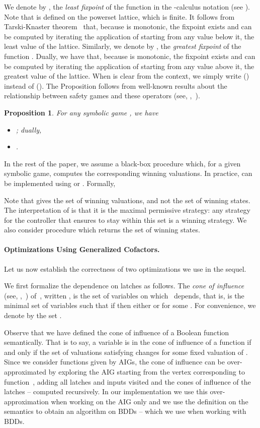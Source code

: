 \documentclass[submission,copyright,creativecommons]{eptcs}
\newtheorem{proposition}{Proposition}
\begin{document}
We denote by , the \emph{least
fixpoint} of the function  in the -calculus
notation (see \cite{ej91}). Note that  is defined on the powerset lattice,
which is finite. It follows from Tarski-Knaster theorem~\cite{tarski55} that,
because  is monotonic, the fixpoint exists and can be computed by iterating
the application of  starting from any value below it, \eg the least value of
the lattice. Similarly, we denote by , the \emph{greatest fixpoint} of the function . Dually, we have that, because  is monotonic, the fixpoint
exists and can be computed by iterating the application of  starting from any
value above it, \eg the greatest value of the lattice.
When  is clear from the context, we simply write  ()
instead of  (). The Proposition follows from well-known
results about the relationship between safety games and these operators (see,
\eg,~\cite{ag11}).
\begin{proposition}
	For any symbolic game , we have
	\begin{itemize}
		\item ; dually,
		\item .
	\end{itemize}
\end{proposition}

In the rest of the paper, we assume a black-box procedure  which, for a
given symbolic game, computes the corresponding winning valuations.  In
practice,  can be implemented using  or . Formally, 

Note that  gives the set of winning valuations, and not the set of
winning states. The interpretation of  is that it is the maximal
permissive strategy: any strategy for the controller that ensures to stay within
this set is a winning strategy.  We also consider procedure  which returns the set of winning states.

\paragraph{Optimizations Using Generalized Cofactors.}
Let us now establish the correctness of two optimizations we use in the sequel.

We first formalize the dependence on latches as follows.  The \emph{cone of
influence} (see, \eg,~\cite{cgp01}) of~, written , is
the set of variables on which~ depends, that is,  is the minimal set of variables such that if  then either  or  for some . For convenience, we denote by  the set .

Observe that we have defined the cone of influence of a Boolean function
semantically. That is to say, a variable  is in the cone of
influence of a function  if and only if the set of valuations satisfying
 changes for some fixed valuation of . Since we consider functions
given by AIGs, the cone of influence can be over-approximated by
exploring the AIG starting from the vertex corresponding to function~,
adding all latches and inputs visited and the cones of influence of the latches
-- computed recursively. In our implementation we use this over-approximation
when working on the AIG only and we use the definition on the semantics to
obtain an algorithm on BDDs -- which we use when working with BDDs.
\end{document}
